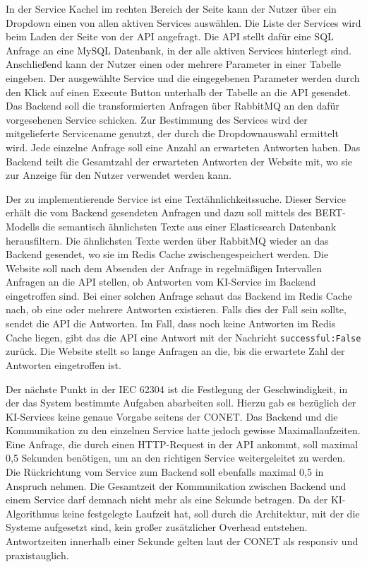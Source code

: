 In der \glqq Service\grqq{} Kachel im rechten Bereich der Seite kann der Nutzer über ein Dropdown einen von allen aktiven Services auswählen. Die Liste der Services wird beim Laden der Seite von der API angefragt. Die API stellt dafür eine SQL Anfrage an eine MySQL Datenbank, in der alle aktiven Services hinterlegt sind. Anschließend kann der Nutzer einen oder mehrere Parameter in einer Tabelle eingeben. Der ausgewählte Service und die eingegebenen Parameter werden durch den Klick auf einen \glqq Execute\grqq{} Button unterhalb der Tabelle an die API gesendet. Das Backend soll die transformierten Anfragen über RabbitMQ an den dafür vorgesehenen Service schicken. Zur Bestimmung des Services wird der mitgelieferte Servicename genutzt, der durch die Dropdownauswahl ermittelt wird. Jede einzelne Anfrage soll eine Anzahl an erwarteten Antworten haben. Das Backend teilt die Gesamtzahl der erwarteten Antworten der Website mit, wo sie zur Anzeige für den Nutzer verwendet werden kann. 

Der zu implementierende Service ist eine Textähnlichkeitssuche. Dieser Service erhält die vom Backend gesendeten Anfragen und dazu soll mittels des BERT-Modells die semantisch ähnlichsten Texte aus einer Elasticsearch Datenbank herausfiltern. Die ähnlichsten Texte werden über RabbitMQ wieder an das Backend gesendet, wo sie im Redis Cache zwischengespeichert werden. Die Website soll nach dem Absenden der Anfrage in regelmäßigen Intervallen Anfragen an die API stellen, ob Antworten vom KI-Service im Backend eingetroffen sind. Bei einer solchen Anfrage schaut das Backend im Redis Cache nach, ob eine oder mehrere Antworten existieren. Falls dies der Fall sein sollte, sendet die API die Antworten. Im Fall, dass noch keine Antworten im Redis Cache liegen, gibt das die API eine Antwort mit der Nachricht \texttt{successful:False} zurück. Die Website stellt so lange Anfragen an die, bis die erwartete Zahl der Antworten eingetroffen ist.

Der nächste Punkt in der IEC 62304 ist die Festlegung der Geschwindigkeit, in der das System bestimmte Aufgaben abarbeiten soll. Hierzu gab es bezüglich der KI-Services keine genaue Vorgabe seitens der CONET. Das Backend und die Kommunikation zu den einzelnen Service hatte jedoch gewisse Maximallaufzeiten. Eine Anfrage, die durch einen HTTP-Request in der API ankommt, soll maximal 0,5 Sekunden benötigen, um an den richtigen Service weitergeleitet zu werden. Die Rückrichtung vom Service zum Backend soll ebenfalls maximal 0,5 in Anspruch nehmen. Die Gesamtzeit der Kommunikation zwischen Backend und einem Service darf demnach nicht mehr als eine Sekunde betragen. Da der KI-Algorithmus keine festgelegte Laufzeit hat, soll durch die Architektur, mit der die Systeme aufgesetzt sind, kein großer zusätzlicher Overhead entstehen. Antwortzeiten innerhalb einer Sekunde gelten laut der CONET als responsiv und praxistauglich.

